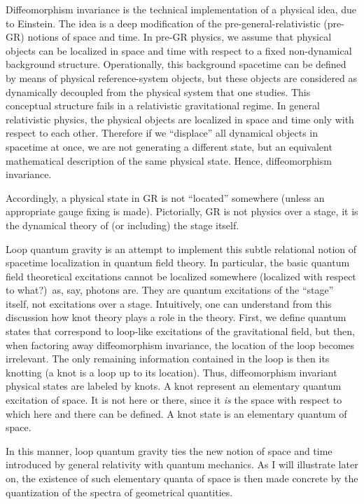 Diffeomorphism invariance is the technical implementation of a 
physical idea, due to Einstein.  The idea is a deep modification 
of the pre-general-relativistic (pre-GR) notions of space and 
time.  In pre-GR physics, we assume that physical objects can be 
localized in space and time with respect to a fixed non-dynamical 
background structure.  Operationally, this background spacetime 
can be defined by means of physical reference-system objects, but 
these objects are considered as dynamically decoupled from the 
physical system that one studies.  This conceptual structure 
fails in a relativistic gravitational regime.  In general 
relativistic physics, the physical objects are localized in space 
and time only with respect to each other.  Therefore if we 
``displace'' all dynamical objects in spacetime at once, we are 
not generating a different state, but an equivalent mathematical 
description of the same physical state.  Hence, diffeomorphism 
invariance.

Accordingly, a physical state in GR is not ``located'' somewhere 
\cite{RovelliHalf,RovelliObservables,RovelliLocalization2} 
(unless an appropriate gauge fixing is made).  Pictorially, GR is 
not physics over a stage, it is the dynamical theory of (or 
including) the stage itself.

Loop quantum gravity is an attempt to implement this subtle 
relational notion of spacetime localization in quantum field 
theory.  In particular, the basic quantum field theoretical 
excitations cannot be localized somewhere (localized with respect 
to what?)\ as, say, photons are.  They are quantum excitations of 
the ``stage'' itself, not excitations over a stage.  Intuitively, 
one can understand from this discussion how knot theory plays a 
role in the theory.  First, we define quantum states that 
correspond to loop-like excitations of the gravitational field, 
but then, when factoring away diffeomorphism invariance, the 
location of the loop becomes irrelevant.  The only remaining 
information contained in the loop is then its knotting (a knot is 
a loop up to its location).  Thus, diffeomorphism invariant 
physical states are labeled by knots.  A knot represent an 
elementary quantum excitation of space.  It is not here or there, 
since it {\em is\/} the space with respect to which here and 
there can be defined.  A knot state is an elementary quantum of 
space.

In this manner, loop quantum gravity ties the new notion of space 
and time introduced by general relativity with quantum mechanics.  
As I will illustrate later on, the existence of such elementary 
quanta of space is then made concrete by the quantization of the 
spectra of geometrical quantities.

